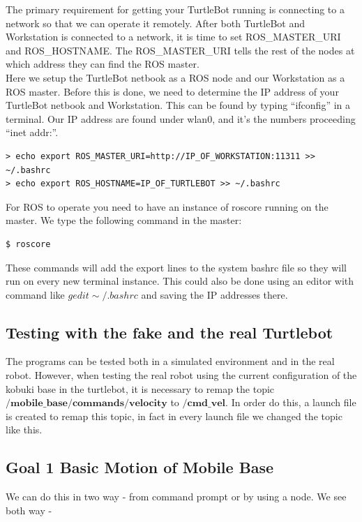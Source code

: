 \documentclass[10pt,a4paper]{article}
\begin{document}
The primary requirement for getting your TurtleBot running is connecting to a network so that we can operate it remotely. After both TurtleBot and Workstation is connected to a network, it is time to set ROS\_MASTER\_URI and ROS\_HOSTNAME. The ROS\_MASTER\_URI tells the rest of the nodes at which address they can find the ROS master.\\

Here we setup the TurtleBot netbook as a ROS node and our Workstation as a ROS master. Before this is done, we need to determine the IP address of your TurtleBot netbook and Workstation. This can be found by typing ``ifconfig'' in a terminal. Our IP address are found under wlan0, and it's the numbers proceeding ``inet addr:''.

\begin{lstlisting}[frame=single] 
> echo export ROS_MASTER_URI=http://IP_OF_WORKSTATION:11311 >> ~/.bashrc
> echo export ROS_HOSTNAME=IP_OF_TURTLEBOT >> ~/.bashrc
\end{lstlisting}
For ROS to operate you need to have an instance of roscore running on the master. We type the following command in the master:

\begin{lstlisting}[frame=single] 
$ roscore
\end{lstlisting}
These commands will add the export lines to the system bashrc file so they will run on every new terminal instance. This could also be done using an editor with command like $gedit \sim/.bashrc$ and saving the IP addresses there.

\subsection{Testing with the fake and the real Turtlebot}
The programs can be tested both in a simulated environment and in the real robot. However, when testing the real robot using the current configuration of the kobuki base in the turtlebot, it is necessary to remap the topic $\textbf{/mobile\_base/commands/velocity}$ to $/\textbf{cmd\_vel}$. In order do this, a launch file is created to remap this topic, in fact in every launch file we changed the topic like this.

\subsection{Goal 1 Basic Motion of Mobile Base}

We can do this in two way - from command prompt or by using a node. We see both way - 
\end{document}
